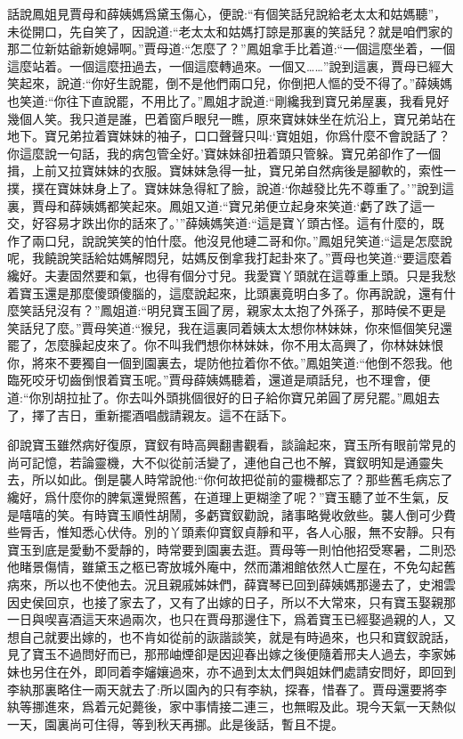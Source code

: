 


\begin{parag}
    話說鳳姐見賈母和薛姨媽爲黛玉傷心，便說:“有個笑話兒說給老太太和姑媽聽”，未從開口，先自笑了，因說道:“老太太和姑媽打諒是那裏的笑話兒？就是咱們家的那二位新姑爺新媳婦啊。”賈母道:“怎麼了？”鳳姐拿手比着道:“一個這麼坐着，一個這麼站着。一個這麼扭過去，一個這麼轉過來。一個又……”說到這裏，賈母已經大笑起來，說道:“你好生說罷，倒不是他們兩口兒，你倒把人慪的受不得了。”薛姨媽也笑道:“你往下直說罷，不用比了。”鳳姐才說道:“剛纔我到寶兄弟屋裏，我看見好幾個人笑。我只道是誰，巴着窗戶眼兒一瞧，原來寶妹妹坐在炕沿上，寶兄弟站在地下。寶兄弟拉着寶妹妹的袖子，口口聲聲只叫:‘寶姐姐，你爲什麼不會說話了？你這麼說一句話，我的病包管全好。’寶妹妹卻扭着頭只管躲。寶兄弟卻作了一個揖，上前又拉寶妹妹的衣服。寶妹妹急得一扯，寶兄弟自然病後是腳軟的，索性一撲，撲在寶妹妹身上了。寶妹妹急得紅了臉，說道:‘你越發比先不尊重了。’”說到這裏，賈母和薛姨媽都笑起來。鳳姐又道:“寶兄弟便立起身來笑道:‘虧了跌了這一交，好容易才跌出你的話來了。’”薛姨媽笑道:“這是寶丫頭古怪。這有什麼的，既作了兩口兒，說說笑笑的怕什麼。他沒見他璉二哥和你。”鳳姐兒笑道:“這是怎麼說呢，我饒說笑話給姑媽解悶兒，姑媽反倒拿我打起卦來了。”賈母也笑道:“要這麼着纔好。夫妻固然要和氣，也得有個分寸兒。我愛寶丫頭就在這尊重上頭。只是我愁着寶玉還是那麼傻頭傻腦的，這麼說起來，比頭裏竟明白多了。你再說說，還有什麼笑話兒沒有？”鳳姐道:“明兒寶玉圓了房，親家太太抱了外孫子，那時侯不更是笑話兒了麼。”賈母笑道:“猴兒，我在這裏同着姨太太想你林妹妹，你來慪個笑兒還罷了，怎麼臊起皮來了。你不叫我們想你林妹妹，你不用太高興了，你林妹妹恨你，將來不要獨自一個到園裏去，堤防他拉着你不依。”鳳姐笑道:“他倒不怨我。他臨死咬牙切齒倒恨着寶玉呢。”賈母薛姨媽聽着，還道是頑話兒，也不理會，便道:“你別胡拉扯了。你去叫外頭挑個很好的日子給你寶兄弟圓了房兒罷。”鳳姐去了，擇了吉日，重新擺酒唱戲請親友。這不在話下。
\end{parag}


\begin{parag}
    卻說寶玉雖然病好復原，寶釵有時高興翻書觀看，談論起來，寶玉所有眼前常見的尚可記憶，若論靈機，大不似從前活變了，連他自己也不解，寶釵明知是通靈失去，所以如此。倒是襲人時常說他:“你何故把從前的靈機都忘了？那些舊毛病忘了纔好，爲什麼你的脾氣還覺照舊，在道理上更糊塗了呢？”寶玉聽了並不生氣，反是嘻嘻的笑。有時寶玉順性胡鬧，多虧寶釵勸說，諸事略覺收斂些。襲人倒可少費些脣舌，惟知悉心伏侍。別的丫頭素仰寶釵貞靜和平，各人心服，無不安靜。只有寶玉到底是愛動不愛靜的，時常要到園裏去逛。賈母等一則怕他招受寒暑，二則恐他睹景傷情，雖黛玉之柩已寄放城外庵中，然而瀟湘館依然人亡屋在，不免勾起舊病來，所以也不使他去。況且親戚姊妹們，薛寶琴已回到薛姨媽那邊去了，史湘雲因史侯回京，也接了家去了，又有了出嫁的日子，所以不大常來，只有寶玉娶親那一日與喫喜酒這天來過兩次，也只在賈母那邊住下，爲着寶玉已經娶過親的人，又想自己就要出嫁的，也不肯如從前的詼諧談笑，就是有時過來，也只和寶釵說話，見了寶玉不過問好而已，那邢岫煙卻是因迎春出嫁之後便隨着邢夫人過去，李家姊妹也另住在外，即同着李嬸孃過來，亦不過到太太們與姐妹們處請安問好，即回到李紈那裏略住一兩天就去了:所以園內的只有李紈，探春，惜春了。賈母還要將李紈等挪進來，爲着元妃薨後，家中事情接二連三，也無暇及此。現今天氣一天熱似一天，園裏尚可住得，等到秋天再挪。此是後話，暫且不提。
\end{parag}


